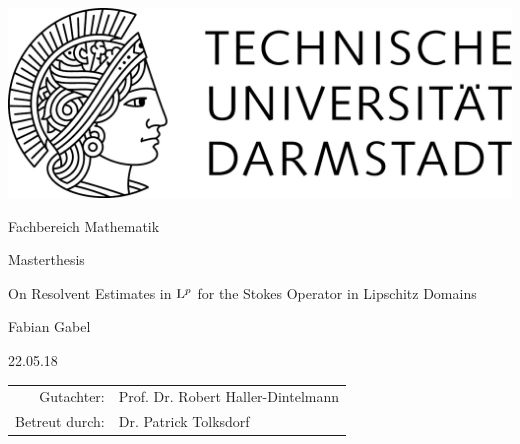 \begin{titlepage}
  \begin{center}
    \includegraphics[width=0.5\linewidth]{TU_Darmstadt_Logo.pdf}
    \vfill
    
    \large{Fachbereich Mathematik}
    \vfill
    
    \large{Masterthesis}
    \vfill

    \huge{On Resolvent Estimates in $\mathrm{L}^p$ for the Stokes Operator in Lipschitz Domains}
    \vfill
    
		\large
    Fabian Gabel

    \large 22.05.18
    \vfill
\begin{tabular}{rl}
    Gutachter:& Prof. Dr. Robert Haller-Dintelmann
    \\
    Betreut durch:& Dr. Patrick Tolksdorf
\end{tabular}
  \end{center}
\end{titlepage}
